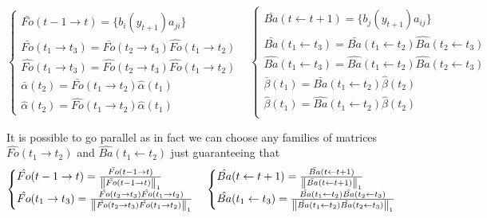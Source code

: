 \begin{equation}
\begin{cases}
\bar{Fo}( t - 1 \rightarrow t) =  \{b_i(y_{t+1})a_{ji}\} & \\
\bar{Fo}( t_1 \rightarrow t_3) =   \bar{Fo}( t_2 \rightarrow t_3) \hat{Fo}( t_1 \rightarrow t_2)& \\
\hat{Fo}( t_1 \rightarrow t_3) =   \hat{Fo}( t_2 \rightarrow t_3) \hat{Fo}( t_1 \rightarrow t_2)& \\
\bar{\alpha}(t_2) =  \bar{Fo}( t_1 \rightarrow t_2) \hat{\alpha}(t_1) & \\
\hat{\alpha}(t_2) =  \hat{Fo}( t_1 \rightarrow t_2) \hat{\alpha}(t_1) &
\end{cases}
\begin{cases}
\bar{Ba}( t \leftarrow t + 1) = \{b_j(y_{t+1})a_{ij}\} & \\
\bar{Ba}(t_1 \leftarrow t_3) = \bar{Ba}(t_1 \leftarrow t_2) \hat{Ba}(t_2 \leftarrow t_3) & \\
\hat{Ba}(t_1 \leftarrow t_3) = \hat{Ba}(t_1 \leftarrow t_2) \hat{Ba}(t_2 \leftarrow t_3) & \\
\bar{\beta}(t_1) =  \bar{Ba}( t_1 \leftarrow t_2) \hat{\beta}(t_2) & \\
\hat{\beta}(t_1) =  \hat{Ba}( t_1 \leftarrow t_2) \hat{\beta}(t_2) & \\
\end{cases}
\end{equation}

It is possible to go parallel as in fact we can choose any families of matrices $\hat{Fo}(t_1 \rightarrow t_2)$ and $\hat{Ba}(t_1 \leftarrow t_2)$ just guaranteeing that
\begin{equation}
\begin{cases}
\hat{Fo}( t - 1 \rightarrow t) = \frac{\bar{Fo}( t - 1 \rightarrow t)}{\left\lVert\bar{Fo}( t - 1 \rightarrow t)\right\rVert_1} & \\
\hat{Fo}( t_1 \rightarrow t_3) =   \frac{\hat{Fo}( t_2 \rightarrow t_3) \hat{Fo}( t_1 \rightarrow t_2)}{\left\lVert\hat{Fo}( t_2 \rightarrow t_3) \hat{Fo}( t_1 \rightarrow t_2)\right\rVert_1}& \\
\end{cases}
\begin{cases}
\hat{Ba}(t \leftarrow t+1) = \frac{\bar{Ba}(t \leftarrow t+1)}{\left\lVert\bar{Ba}(t \leftarrow t+1)\right\rVert_1} & \\
\hat{Ba}(t_1 \leftarrow t_3) = \frac{\hat{Ba}(t_1 \leftarrow t_2) \hat{Ba}(t_2 \leftarrow t_3)}{\left\lVert\hat{Ba}(t_1 \leftarrow t_2) \hat{Ba}(t_2 \leftarrow t_3)\right\rVert_1} & \\
\end{cases}
\end{equation}

